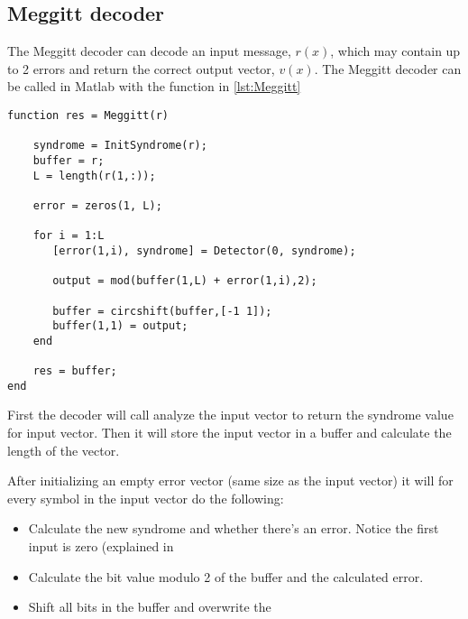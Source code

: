 \documentclass[Main]{subfiles}
\begin{document}
\subsection{Meggitt decoder}

The Meggitt decoder can decode an input message, $r(x)$, which may contain up to 2 errors and return the correct output vector, $v(x)$.
The Meggitt decoder can be called in Matlab with the function in \codeTitle \ref{lst:Meggitt}

\begin{lstlisting}[caption=Meggit decoder function, style=Code-Matlab, label=lst:Meggitt]
function res = Meggitt(r)

	syndrome = InitSyndrome(r);
	buffer = r;
	L = length(r(1,:));
	
	error = zeros(1, L);
	
	for i = 1:L
	   [error(1,i), syndrome] = Detector(0, syndrome); 
	
	   output = mod(buffer(1,L) + error(1,i),2);
	
	   buffer = circshift(buffer,[-1 1]);
	   buffer(1,1) = output;   
	end
	
	res = buffer;
end
\end{lstlisting}
First the decoder will call analyze the input vector to return the syndrome value for input vector.
Then it will store the input vector in a buffer and calculate the length of the vector.

After initializing an empty error vector (same size as the input vector) it will for every symbol in the input vector do the following:
\begin{itemize}

\item Calculate the new syndrome and whether there's an error. Notice the first input is zero (explained in 

\item Calculate the bit value modulo 2 of the buffer and the calculated error.

\item Shift all bits in the buffer and overwrite the 
\end{itemize}
\end{document}
